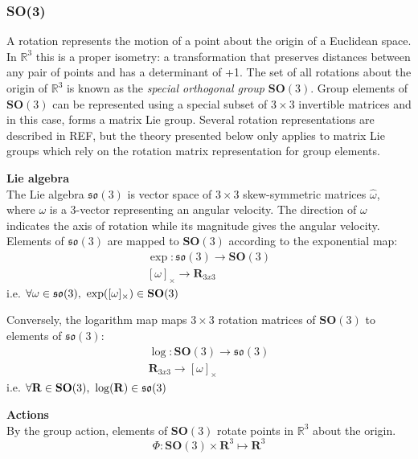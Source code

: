 		
	\subsubsection{\textbf{SO}(3)}	
		A rotation represents the motion of a point about the origin of a Euclidean space. In $\mathbb{R}^3$ this is a proper isometry: a transformation that preserves distances between any pair of points and has a determinant of +1. The set of all rotations about the origin of $\mathbb{R}^3$ is known as the \textit{special orthogonal group} $\textbf{SO}(3)$.
		Group elements of $\textbf{SO}(3)$ can be represented using a special subset of $3 \times 3$ invertible matrices and in this case, forms a matrix Lie group. Several rotation representations are described in REF, but the theory presented below only applies to matrix Lie groups which rely on the rotation matrix representation for group elements.
		
		\textbf{Lie algebra}\\
		The Lie algebra $\mathfrak{so}(3)$ is vector space of $3 \times 3$ skew-symmetric matrices $\hat{\omega}$, where $\omega$ is a 3-vector representing an angular velocity. The direction of $\omega$ indicates the axis of rotation while its magnitude gives the angular velocity. 
		Elements of $\mathfrak{so}(3)$ are mapped to $\textbf{SO}(3)$ according to the exponential map:
		\begin{equation}
			\begin{split}
				\exp: \mathfrak{so}(3) \rightarrow \mathbf{SO}(3)\\
				[\omega]_\times \rightarrow \mathbf{R}_{3x3}
			\end{split}		
		\end{equation}		
		i.e. $\forall \omega \in \mathfrak{so}(3) \textnormal{, } \exp([\omega]_\times) \in  \mathbf{SO}(3)$
		
		Conversely, the logarithm map maps $3 \times 3$ rotation matrices of $\mathbf{SO}(3)$ to elements of $\mathfrak{so}(3)$:
		\begin{equation}
			\begin{split}
				\log: \mathbf{SO}(3) \rightarrow \mathfrak{so}(3)\\
				 \mathbf{R}_{3x3} \rightarrow [\omega]_\times
			\end{split}		
		\end{equation}		
		i.e. $\forall \mathbf{R} \in \mathbf{SO}(3)  \textnormal{, } \log(\mathbf{R}) \in  \mathfrak{so}(3)$
				
		\textbf{Actions}\\
		By the group action, elements of $\mathbf{SO}(3)$ rotate points in $\mathbb{R}^3$ about the origin. 
		\begin{equation}
			\Phi: \mathbf{SO}(3) \times \mathbf{R}^3 \mapsto \mathbf{R}^3
		\end{equation}
		
